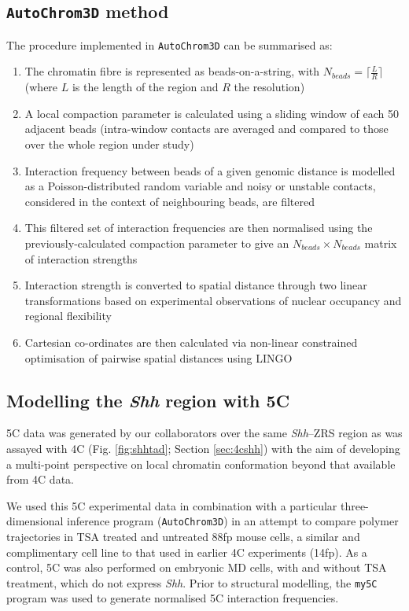 \documentclass[a4paper,11pt,oneside]{book}
\begin{document}
\subsection{\texttt{AutoChrom3D} method}\label{sec:achrom}

The procedure implemented in \texttt{AutoChrom3D} can be summarised as:\cite{Peng2013}

\begin{enumerate}
\item The chromatin fibre is represented as beads-on-a-string, with $N_{beads} = \lceil\frac{L}{R}\rceil$ (where $L$ is the length of the region and $R$ the resolution)
\item A local compaction parameter is calculated using a sliding window of each 50 adjacent beads (intra-window contacts are averaged and compared to those over the whole region under study)
\item Interaction frequency between beads of a given genomic distance is modelled as a Poisson-distributed random variable and noisy or unstable contacts, considered in the context of neighbouring beads, are filtered
\item This filtered set of interaction frequencies are then normalised using the previously-calculated compaction parameter to give an $N_{beads} \times N_{beads}$ matrix of interaction strengths
\item Interaction strength is converted to spatial distance through two linear transformations based on experimental observations of nuclear occupancy and regional flexibility\cite{Kalhor2012}
\item Cartesian co-ordinates are then calculated via non-linear constrained optimisation of pairwise spatial distances using LINGO\cite{lingo}
\end{enumerate}

\subsection{Modelling the \emph{Shh} region with 5C}\label{sec:shh5c}

5C data was generated by our collaborators over the same \emph{Shh}--ZRS region as was assayed with 4C (Fig. \ref{fig:shhtad}; Section \ref{sec:4cshh}) with the aim of developing a multi-point perspective on local chromatin conformation beyond that available from 4C data.

We used this 5C experimental data in combination with a particular three-dimensional inference program  (\texttt{AutoChrom3D}\cite{Peng2013}) in an attempt to compare polymer trajectories in TSA treated and untreated 88fp mouse cells, a similar and complimentary cell line to that used in earlier 4C experiments (14fp). As a control, 5C was also performed on embryonic MD cells, with and without TSA treatment, which do not express \emph{Shh}. Prior to structural modelling, the \texttt{my5C} program was used to generate normalised 5C interaction frequencies.\cite{Lajoie2009a}
\end{document}
